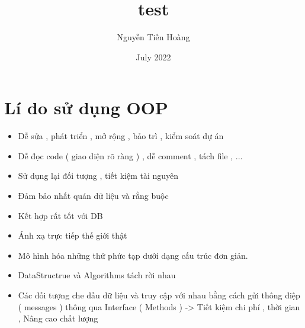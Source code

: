 \documentclass{article}
\title{test}
\author{Nguyễn Tiến Hoàng}
\date{July 2022}
\begin{document}
\maketitle

\section{Lí do sử dụng OOP}
\begin{itemize}
  \item Dễ sửa , phát triển , mở rộng , bảo trì ,  kiểm soát dự án
  \item Dễ đọc code ( giao diện rõ ràng ) , dễ comment , tách file , ...
  \item Sử dụng lại đối tượng , tiết kiệm tài nguyên
  \item Đảm bảo nhất quán dữ liệu và rằng buộc
  \item Kết hợp rất tốt với DB
  \item Ánh xạ trực tiếp thế giới thật
  \item Mô hình hóa những thứ phức tạp dưới dạng cấu trúc đơn giản.
  \item DataStructrue và Algorithms tách rời nhau
  \item Các đối tượng che dấu dữ liệu và truy cập với nhau bằng cách gửi thông điệp ( messages ) thông qua Interface ( Methods )
        \hfill \break \break -> Tiết kiệm chi phí , thời gian , Nâng cao chất lượng
\end{itemize}
\end{document}
